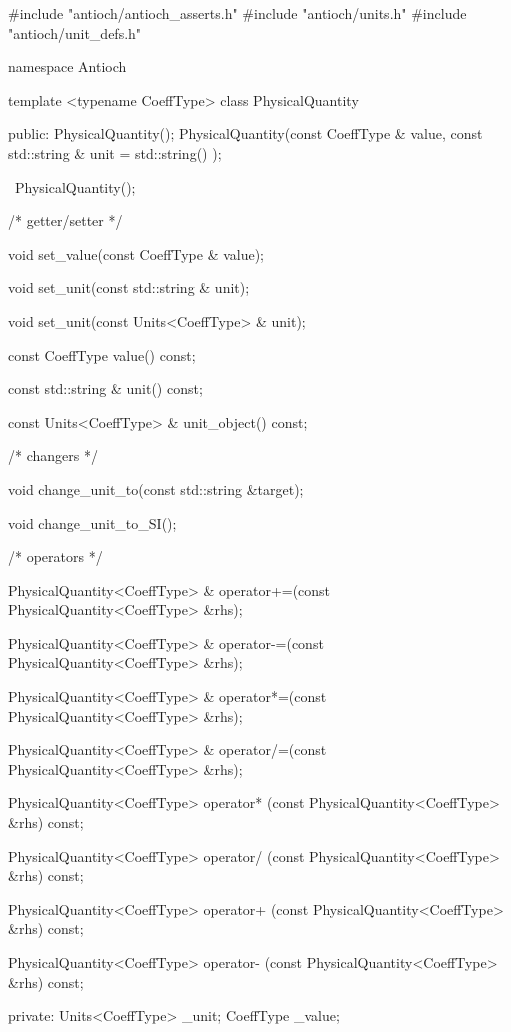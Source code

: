 \begin{cpp}[\tiny]
#include "antioch/antioch_asserts.h"
#include "antioch/units.h"
#include "antioch/unit_defs.h"

namespace Antioch{

  template <typename CoeffType>
  class PhysicalQuantity{

    public:
        PhysicalQuantity();
        PhysicalQuantity(const CoeffType & value, const std::string & unit = std::string() );

        ~PhysicalQuantity();

        /* getter/setter */

        void set_value(const CoeffType & value);

        void set_unit(const std::string & unit);

        void set_unit(const Units<CoeffType> & unit);

        const CoeffType value() const;

        const std::string & unit() const;

        const Units<CoeffType> & unit_object() const;

        /* changers */

        void change_unit_to(const std::string &target);

        void change_unit_to_SI();

        /* operators */

        PhysicalQuantity<CoeffType> & operator+=(const PhysicalQuantity<CoeffType> &rhs);

        PhysicalQuantity<CoeffType> & operator-=(const PhysicalQuantity<CoeffType> &rhs);

        PhysicalQuantity<CoeffType> & operator*=(const PhysicalQuantity<CoeffType> &rhs);

        PhysicalQuantity<CoeffType> & operator/=(const PhysicalQuantity<CoeffType> &rhs);

        PhysicalQuantity<CoeffType>   operator* (const PhysicalQuantity<CoeffType> &rhs) const;

        PhysicalQuantity<CoeffType>   operator/ (const PhysicalQuantity<CoeffType> &rhs) const;

        PhysicalQuantity<CoeffType>   operator+ (const PhysicalQuantity<CoeffType> &rhs) const;

        PhysicalQuantity<CoeffType>   operator- (const PhysicalQuantity<CoeffType> &rhs) const;

    private:
        Units<CoeffType> _unit;
        CoeffType        _value;

}}
\end{cpp}
